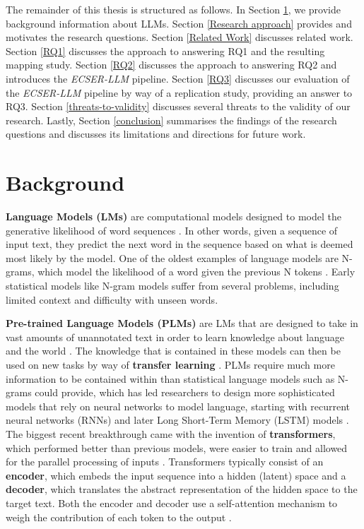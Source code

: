 \documentclass[a4paper]{article}
\newcommand{\newecser}{\textit{ECSER-LLM} }
\begin{document}
The remainder of this thesis is structured as follows. In Section \ref{Background}, we provide background information about LLMs. Section \ref{Research approach} provides and motivates the research questions. Section \ref{Related Work} discusses related work. Section \ref{RQ1} discusses the approach to answering RQ1 and the resulting mapping study. Section \ref{RQ2} discusses the approach to answering RQ2 and introduces the \newecser pipeline. Section \ref{RQ3} discusses our evaluation of the \newecser pipeline by way of a replication study, providing an answer to RQ3. Section \ref{threats-to-validity} discusses several threats to the validity of our research. Lastly, Section \ref{conclusion} summarises the findings of the research questions and discusses its limitations and directions for future work.

\section{Background}\label{Background}
\textbf{Language Models (LMs)} are computational models designed to model the generative likelihood of word sequences \cite{zhao2025}. In other words, given a sequence of input text, they predict the next word in the sequence based on what is deemed most likely by the model. One of the oldest examples of language models are N-grams, which model the likelihood of a word given the previous N tokens \cite{shannon1948}. Early statistical models like N-gram models suffer from several problems, including limited context and difficulty with unseen words.

\textbf{Pre-trained Language Models (PLMs)} are LMs that are designed to take in vast amounts of unannotated text in order to learn knowledge about language and the world \cite{jurafsky2025}. The knowledge that is contained in these models can then be used on new tasks by way of \textbf{transfer learning} \cite{wang2023plm}. PLMs require much more information to be contained within than statistical language models such as N-grams could provide, which has led researchers to design more sophisticated models that rely on neural networks to model language, starting with recurrent neural networks (RNNs) and later Long Short-Term Memory (LSTM) models \cite{mikolov2012rnn,hochreiter1997lstm}. The biggest recent breakthrough came with the invention of \textbf{transformers}, which performed better than previous models, were easier to train and allowed for the parallel processing of inputs \cite{Vaswani2017transformer}. Transformers typically consist of an \textbf{encoder}, which embeds the input sequence into a hidden (latent) space and a \textbf{decoder}, which translates the abstract representation of the hidden space to the target text. Both the encoder and decoder use a self-attention mechanism to weigh the contribution of each token to the output \cite{Vaswani2017transformer,bahdanau2016attention}.
\end{document}
